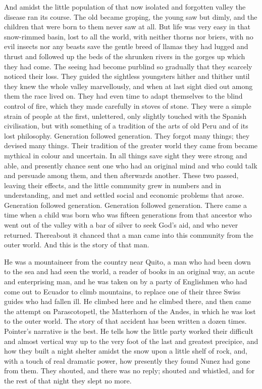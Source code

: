 \documentclass[courier]{sffms}
\begin{document}
And amidst the little population of that now isolated and forgotten
valley the disease ran its course. The old became groping, the young
saw but dimly, and the children that were born to them never saw at
all. But life was very easy in that snow-rimmed basin, lost to all the
world, with neither thorns nor briers, with no evil insects nor any
beasts save the gentle breed of llamas they had lugged and thrust and
followed up the beds of the shrunken rivers in the gorges up which
they had come. The seeing had become purblind so gradually that they
scarcely noticed their loss. They guided the sightless youngsters
hither and thither until they knew the whole valley marvellously, and
when at last sight died out among them the race lived on. They had
even time to adapt themselves to the blind control of fire, which they
made carefully in stoves of stone. They were a simple strain of people
at the first, unlettered, only slightly touched with the Spanish
civilisation, but with something of a tradition of the arts of old
Peru and of its lost philosophy. Generation followed generation. They
forgot many things; they devised many things. Their tradition of the
greater world they came from became mythical in colour and
uncertain. In all things save sight they were strong and able, and
presently chance sent one who had an original mind and who could talk
and persuade among them, and then afterwards another. These two
passed, leaving their effects, and the little community grew in
numbers and in understanding, and met and settled social and economic
problems that arose.  Generation followed generation. Generation
followed generation. There came a time when a child was born who was
fifteen generations from that ancestor who went out of the valley with
a bar of silver to seek God's aid, and who never returned. Thereabout
it chanced that a man came into this community from the outer
world. And this is the story of that man.

He was a mountaineer from the country near Quito, a man who had been
down to the sea and had seen the world, a reader of books in an
original way, an acute and enterprising man, and he was taken on by a
party of Englishmen who had come out to Ecuador to climb mountains, to
replace one of their three Swiss guides who had fallen ill. He climbed
here and he climbed there, and then came the attempt on Parascotopetl,
the Matterhorn of the Andes, in which he was lost to the outer
world. The story of that accident has been written a dozen
times. Pointer's narrative is the best. He tells how the little party
worked their difficult and almost vertical way up to the very foot of
the last and greatest precipice, and how they built a night shelter
amidst the snow upon a little shelf of rock, and, with a touch of real
dramatic power, how presently they found Nunez had gone from
them. They shouted, and there was no reply; shouted and whistled, and
for the rest of that night they slept no more.
\end{document}
